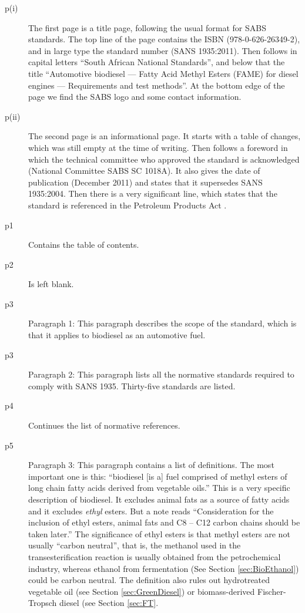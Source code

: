 \begin{description}


\item[p(i)]{The first page is a title page, following the usual format for SABS
standards. The top line of the page contains the ISBN (978-0-626-26349-2), and
in large type the standard number (SANS 1935:2011). Then follows in capital
letters ``South African National Standards'', and below that the title
``Automotive biodiesel --- Fatty Acid Methyl Esters (FAME) for diesel engines
--- Requirements and test methods''. At the bottom edge of the page we find the
SABS logo and some contact information.}

\item[p(ii)]{The second page is an informational page. It starts with a table of
changes, which was still empty at the time of writing. Then follows a foreword
in which the technical committee who approved the standard is acknowledged
(National Committee SABS SC 1018A). It also gives the date of publication
(December 2011) and states that it supersedes SANS 1935:2004. Then there is a
very significant line, which states that the standard is referenced in the
Petroleum Products Act \autocite{Act120-1997}. }
	
\item[p1]{Contains the table of contents.} 

\item[p2]{Is left blank.}

\item[p3]{Paragraph 1: This paragraph describes the scope of the standard, which
is that it applies to biodiesel as an automotive fuel.} 

\item[p3]{Paragraph 2:
This paragraph lists all the normative standards required to comply with SANS
1935. Thirty-five standards are listed.}

\item[p4]{Continues the list of normative references.}

\item[p5]{Paragraph 3: This paragraph contains a list of definitions. The most
important one is this: ``biodiesel [is a] fuel comprised of methyl esters of
long chain fatty acids derived from vegetable oils.'' This is a very specific
description of biodiesel. It excludes animal fats as a source of fatty acids
and it excludes \textit{ethyl} esters. But a note reads ``Consideration for the
inclusion of ethyl esters, animal fats and C8 – C12 carbon chains should be
taken later.'' The significance of ethyl esters is that methyl esters are not
usually ``carbon neutral'', that is, the methanol used in the transesterification
reaction is usually obtained from the petrochemical industry, whereas ethanol
from fermentation (See Section \ref{sec:BioEthanol}) could be carbon neutral.
The definition also rules out hydrotreated vegetable oil (see Section
\ref{sec:GreenDiesel}) or biomass-derived Fischer-Tropsch diesel (see Section
\ref{sec:FT}.}


\end{description}
